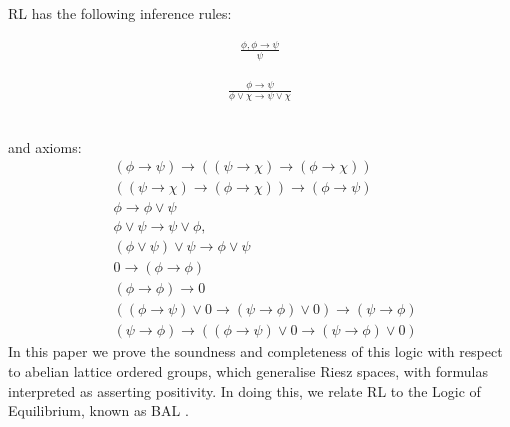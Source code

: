 \documentclass[preprint,leqno]{elsarticle}
\begin{document}




RL has the following inference rules:\\
\begin{minipage}{0.49\textwidth}
\begin{gather}
  \tag{MP} \frac{\phi, \phi \rightarrow \psi}{\psi}
\end{gather}
\end{minipage}
\begin{minipage}{0.49\textwidth}
\begin{gather}
  \tag{RI} \frac{\phi \rightarrow \psi}{\phi \lor \chi \rightarrow \psi \lor \chi}
\end{gather}
\end{minipage}
\vspace{0.3cm}\\
and axioms:
\begin{align}
  \tag{R1a} &(\phi \rightarrow \psi) \rightarrow ((\psi \rightarrow \chi)
  \rightarrow (\phi \rightarrow \chi))\\
  \tag{R1b} &((\psi \rightarrow \chi) \rightarrow (\phi \rightarrow
  \chi)) \rightarrow (\phi \rightarrow \psi)\\
  \tag{R2} &\phi \rightarrow \phi \lor \psi\\
  \tag{R3} &\phi \lor \psi \rightarrow \psi \lor \phi,\\
  \tag{R4} &(\phi \lor \psi)\lor \psi \rightarrow \phi \lor \psi\\
  \tag{R5a} &0 \rightarrow (\phi \rightarrow \phi)\\
  \tag{R5b} &(\phi \rightarrow\phi) \rightarrow 0\\
  \tag{R6a} &((\phi \rightarrow \psi)\lor 0 \rightarrow (\psi \rightarrow \phi) \lor 0) \rightarrow (\psi \rightarrow \phi)\\
  \tag{R6b} & (\psi \rightarrow \phi) \rightarrow ((\phi \rightarrow \psi)\lor 0 \rightarrow (\psi \rightarrow \phi) \lor 0)
\end{align}
In this paper we prove the soundness and completeness of this logic
with respect to abelian lattice ordered groups, which generalise Riesz
spaces, with formulas interpreted as asserting positivity. In doing
this, we relate RL to the Logic of Equilibrium, known as BAL
\cite{Galli:04}.
\end{document}
